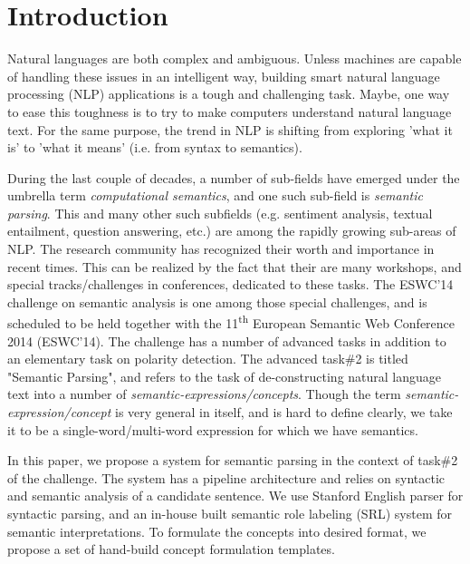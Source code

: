 \documentclass[runningheads,a4paper]{llncs}
\begin{document}
\section{Introduction}
Natural languages are both complex and ambiguous. Unless machines are capable of handling these issues in an intelligent way, building smart natural language processing (NLP) applications is a tough and challenging task. Maybe, one way to ease this toughness is to try to make computers understand natural language text. For the same purpose, the trend in NLP is shifting from exploring 'what it is' to 'what it means' (i.e. from syntax to semantics). 

During the last couple of decades, a number of sub-fields have emerged under the umbrella term \textit{computational semantics}, and one such sub-field is \textit{semantic parsing}. This and many other such subfields (e.g. sentiment analysis, textual entailment, question answering, etc.) are among the rapidly growing sub-areas of NLP. The research community has recognized their worth and importance in recent times. This can be realized by the fact that their are many workshops, and special tracks/challenges in conferences, dedicated to these tasks. The ESWC'14 challenge on semantic analysis is one among those special challenges, and is scheduled to be held together with the 11\textsuperscript{th} European Semantic Web Conference 2014 (ESWC'14). The challenge has a number of advanced tasks in addition to an elementary task on polarity detection. The advanced task\#2 is titled "Semantic Parsing", and refers to the task of de-constructing natural language text into a number of \textit{semantic-expressions/concepts}. Though the term \textit{semantic-expression/concept} is very general in itself, and is hard to define clearly, we take it to be a single-word/multi-word expression for which we have semantics.  


In this paper, we propose a system for semantic parsing in the context of task\#2 of the challenge. The system has a pipeline architecture and relies on syntactic and semantic analysis of a candidate sentence. We use Stanford English parser \cite{stanford} for syntactic parsing, and an in-house built semantic role labeling (SRL) system for semantic interpretations. To formulate the concepts into desired format, we propose a set of hand-build concept formulation templates. 
                
\end{document}
